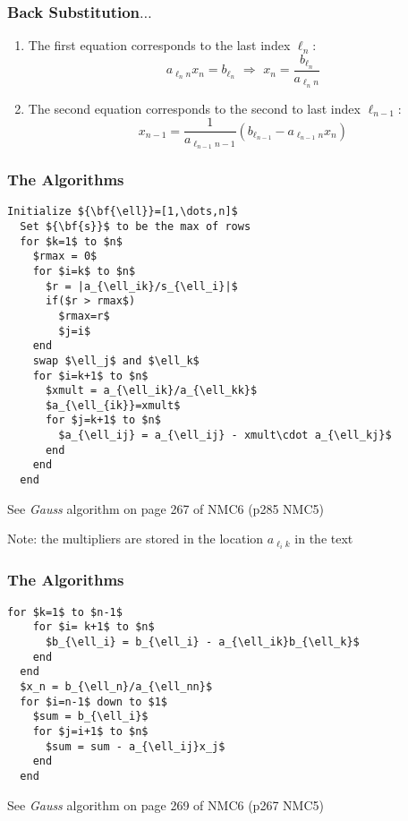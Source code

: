 \documentclass[10pt]{beamer}
\begin{document}
\begin{frame}
\frametitle{Back Substitution$\ldots$}
\begin{enumerate}
  \item The first equation corresponds to the last index $\ell_n$:
\begin{equation*}
  a_{\ell_nn} x_n = b_{\ell_n} \,\,\Rightarrow\,\, x_n = \frac{b_{\ell_n}}{a_{\ell_nn}}
\end{equation*}
  \item The second equation corresponds to the second to last index
$\ell_{n-1}$:
\begin{equation*}
  x_{n-1} = \frac{1}{a_{\ell_{n-1}n-1}}\left(b_{\ell_{n-1}} -
a_{\ell_{n-1}n}x_n\right)
\end{equation*}
\end{enumerate}
\end{frame}
\begin{frame}
\frametitle{The Algorithms}
\begin{lstlisting}[mathescape,caption=(forward) GE with SPP]
  Initialize ${\bf{\ell}}=[1,\dots,n]$
  Set ${\bf{s}}$ to be the max of rows
  for $k=1$ to $n$
    $rmax = 0$
    for $i=k$ to $n$
      $r = |a_{\ell_ik}/s_{\ell_i}|$
      if($r > rmax$)
        $rmax=r$
        $j=i$
    end
    swap $\ell_j$ and $\ell_k$
    for $i=k+1$ to $n$
      $xmult = a_{\ell_ik}/a_{\ell_kk}$
      $a_{\ell_{ik}}=xmult$
      for $j=k+1$ to $n$
        $a_{\ell_ij} = a_{\ell_ij} - xmult\cdot a_{\ell_kj}$
      end
    end
  end
\end{lstlisting}
See \emph{Gauss} algorithm on page 267 of NMC6 (p285 NMC5)
\end{frame}
\begin{frame}
Note: the multipliers are stored in the location $a_{\ell_ik}$ in the
text
\frametitle{The Algorithms}
\begin{lstlisting}[mathescape,caption=(back solve) GE with SPP]
  for $k=1$ to $n-1$
    for $i= k+1$ to $n$
      $b_{\ell_i} = b_{\ell_i} - a_{\ell_ik}b_{\ell_k}$
    end
  end
  $x_n = b_{\ell_n}/a_{\ell_nn}$
  for $i=n-1$ down to $1$
    $sum = b_{\ell_i}$
    for $j=i+1$ to $n$
      $sum = sum - a_{\ell_ij}x_j$
    end
  end
\end{lstlisting}
See \emph{Gauss} algorithm on page 269 of NMC6 (p267 NMC5)
\end{frame}
\end{document}
